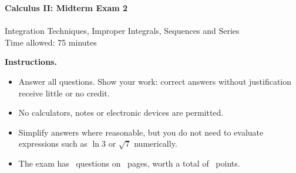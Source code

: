 \documentclass[11pt,addpoints]{exam}
\begin{document}
\begin{center}
  {\Large\bfseries Calculus II: Midterm Exam 2}\\[4pt]
  \\[4pt]\fi
  Integration Techniques, Improper Integrals, Sequences and Series\\[2pt]
  Time allowed: 75 minutes
\end{center}

\vspace{0.5em}

\vspace{1em}
\noindent\textbf{Instructions.}
\begin{itemize}[nosep]
  \item Answer all questions. Show your work: correct answers without justification receive little or no credit.
  \item No calculators, notes or electronic devices are permitted.
  \item Simplify answers where reasonable, but you do not need to evaluate expressions such as $\ln 3$ or $\sqrt{7}$ numerically.
  \item The exam has \numquestions\ questions on \numpages\ pages, worth a total of \numpoints\ points.
\end{itemize}

\begin{center}
  \gradetable[h][questions]
\end{center}

\newpage
\end{document}
